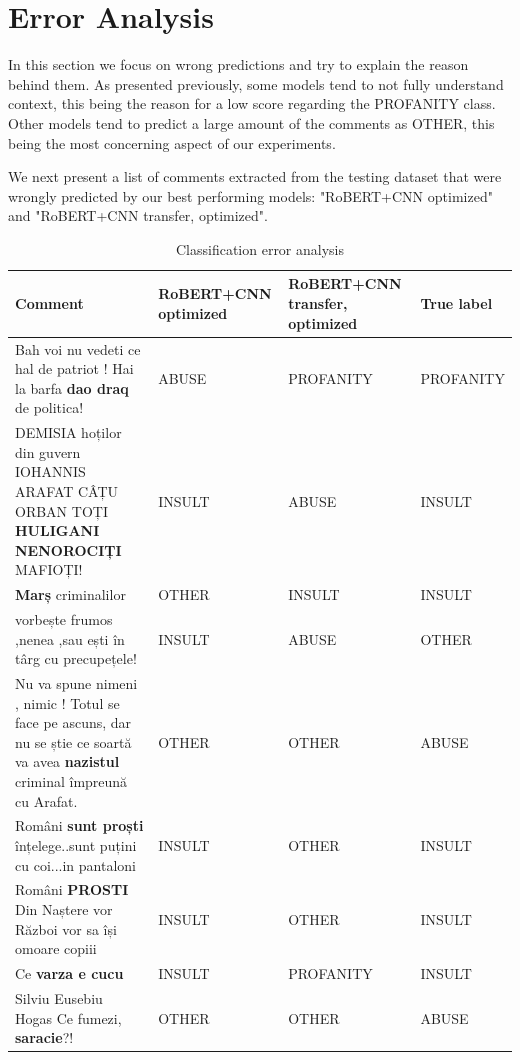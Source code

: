 \documentclass[12pt,a4paper]{report}
\begin{document}
\section{Error Analysis}

In this section we focus on wrong predictions and try to explain the reason behind them. As presented previously, some models tend to not fully understand context, this being the reason for a low score regarding the PROFANITY class. Other models tend to predict a large amount of the comments as OTHER, this being the most concerning aspect of our experiments.

We next present a list of comments extracted from the testing dataset that were wrongly predicted by our best performing models: "RoBERT+CNN optimized" and "RoBERT+CNN transfer, optimized".

\begin{table}[H]\small\linespread{1}
\centering
\caption{Classification error analysis}
\label{tab:errorAnalysisTest}
\begin{tabular}{ p{6cm} | p{3cm} | p{3.5cm} | p{2.5cm} } 
  \hline
  \textbf{Comment} & \textbf{RoBERT+CNN optimized} & \textbf{RoBERT+CNN transfer, optimized} & \textbf{True label}\\\hline
  Bah voi nu vedeti ce hal de patriot ! Hai la barfa \textbf{dao draq} de politica! & ABUSE & PROFANITY & PROFANITY\\\hline
  DEMISIA hoților din guvern IOHANNIS ARAFAT CÂȚU ORBAN TOȚI  \textbf{HULIGANI NENOROCIȚI} MAFIOȚI! & INSULT & ABUSE & INSULT \\\hline
   \textbf{Marș} criminalilor & OTHER & INSULT & INSULT\\\hline
  vorbește frumos ,nenea ,sau ești în târg cu precupețele! & INSULT & ABUSE & OTHER\\\hline
  Nu va spune nimeni , nimic ! Totul se face pe ascuns, dar nu se știe ce soartă va avea  \textbf{nazistul} criminal împreună cu Arafat. & OTHER & OTHER & ABUSE\\\hline
  Români  \textbf{sunt proști} înțelege..sunt puțini cu coi...in pantaloni & INSULT & OTHER & INSULT\\\hline
  Români  \textbf{PROSTI} Din Naștere vor Război vor sa își omoare copiii & INSULT & OTHER & INSULT\\\hline
  Ce  \textbf{varza e cucu} & INSULT & PROFANITY & INSULT\\\hline
  Silviu Eusebiu Hogas Ce fumezi,  \textbf{saracie}?! & OTHER & OTHER & ABUSE\\\hline

\end{tabular}
\end{table}
\end{document}
